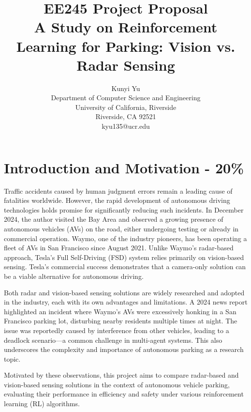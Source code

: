 \documentclass{article}
\title{EE245 Project Proposal \\ \large A Study on Reinforcement Learning for Parking: Vision vs. Radar Sensing}
\author{
  Kunyi Yu\\
  Department of Computer Science and Engineering\\
  University of California, Riverside\\
  Riverside, CA 92521\\
  kyu135@ucr.edu
}
\begin{document}
\maketitle



\section{Introduction and Motivation - 20\%}

Traffic accidents caused by human judgment errors remain a leading cause of fatalities worldwide. However, the rapid development of autonomous driving technologies holds promise for significantly reducing such incidents. In December 2024, the author visited the Bay Area and observed a growing presence of autonomous vehicles (AVs) on the road, either undergoing testing or already in commercial operation. Waymo, one of the industry pioneers, has been operating a fleet of AVs in San Francisco since August 2021. Unlike Waymo’s radar-based approach, Tesla’s Full Self-Driving (FSD) system relies primarily on vision-based sensing. Tesla’s commercial success demonstrates that a camera-only solution can be a viable alternative for autonomous driving.

Both radar and vision-based sensing solutions are widely researched and adopted in the industry, each with its own advantages and limitations. A 2024 news report \cite{news2024} highlighted an incident where Waymo’s AVs were excessively honking in a San Francisco parking lot, disturbing nearby residents multiple times at night. The issue was reportedly caused by interference from other vehicles, leading to a deadlock scenario—a common challenge in multi-agent systems. This also underscores the complexity and importance of autonomous parking as a research topic.

Motivated by these observations, this project aims to compare radar-based and vision-based sensing solutions in the context of autonomous vehicle parking, evaluating their performance in efficiency and safety under various reinforcement learning (RL) algorithms.
\end{document}
